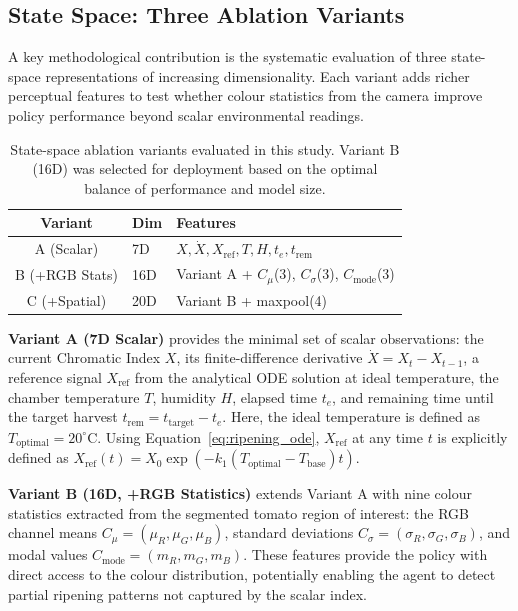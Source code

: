     \subsection{State Space: Three Ablation Variants}
        \label{subsec:state_variants}

    A key methodological contribution is the systematic evaluation of three state-space representations of increasing dimensionality. Each variant adds richer perceptual features to test whether colour statistics from the camera improve policy performance beyond scalar environmental readings.

    \begin{table}[ht]
        \caption{State-space ablation variants evaluated in this study. Variant B (16D) was selected for deployment based on the optimal balance of performance and model size.}
        \label{tab:state_variants}
        \centering
        \begin{tabular}{clp{6cm}}
            \hline
            \textbf{Variant} & \textbf{Dim} & \textbf{Features} \\
            \hline
            A (Scalar) & 7D & $X, \dot{X}, X_{\text{ref}}, T, H, t_e, t_{\text{rem}}$ \\
            B (+RGB Stats) & 16D & Variant A + $C_\mu$(3), $C_\sigma$(3), $C_{\text{mode}}$(3) \\
            C (+Spatial) & 20D & Variant B + maxpool(4) \\
            \hline
        \end{tabular}
    \end{table}

    \textbf{Variant A (7D Scalar)} provides the minimal set of scalar observations: the current Chromatic Index $X$, its finite-difference derivative $\dot{X} = X_t - X_{t-1}$, a reference signal $X_{\text{ref}}$ from the analytical ODE solution at ideal temperature, the chamber temperature $T$, humidity $H$, elapsed time $t_e$, and remaining time until the target harvest $t_{\text{rem}} = t_{\text{target}} - t_e$. Here, the ideal temperature is defined as $T_{\text{optimal}} = 20^{\circ}$C. Using Equation~\ref{eq:ripening_ode}, $X_{\text{ref}}$ at any time $t$ is explicitly defined as $X_{\text{ref}}(t) = X_0 \exp(-k_1 (T_{\text{optimal}} - T_{\text{base}}) t)$.

    \textbf{Variant B (16D, +RGB Statistics)} extends Variant A with nine colour statistics extracted from the segmented tomato region of interest: the RGB channel means $C_\mu = (\mu_R, \mu_G, \mu_B)$, standard deviations $C_\sigma = (\sigma_R, \sigma_G, \sigma_B)$, and modal values $C_{\text{mode}} = (m_R, m_G, m_B)$. These features provide the policy with direct access to the colour distribution, potentially enabling the agent to detect partial ripening patterns not captured by the scalar index.

